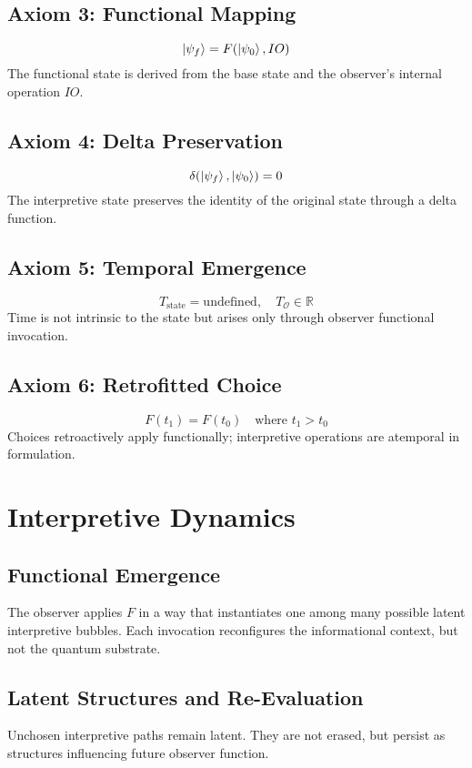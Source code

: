 \documentclass[12pt]{article}
\begin{document}
\subsection*{Axiom 3: Functional Mapping}
\[
\ket{\psi_f} = F(\ket{\psi_0}, IO)
\]
The functional state is derived from the base state and the observer's internal operation $IO$.

\subsection*{Axiom 4: Delta Preservation}
\[
\delta(\ket{\psi_f}, \ket{\psi_0}) = 0
\]
The interpretive state preserves the identity of the original state through a delta function.

\subsection*{Axiom 5: Temporal Emergence}
\[
T_{\text{state}} = \text{undefined}, \quad T_{\mathcal{O}} \in \mathbb{R}
\]
Time is not intrinsic to the state but arises only through observer functional invocation.

\subsection*{Axiom 6: Retrofitted Choice}
\[
F(t_1) = F(t_0) \quad \text{where } t_1 > t_0
\]
Choices retroactively apply functionally; interpretive operations are atemporal in formulation.

\section{Interpretive Dynamics}

\subsection{Functional Emergence}
The observer applies $F$ in a way that instantiates one among many possible latent interpretive bubbles. Each invocation reconfigures the informational context, but not the quantum substrate.

\subsection{Latent Structures and Re-Evaluation}
Unchosen interpretive paths remain latent. They are not erased, but persist as structures influencing future observer function.
\end{document}
